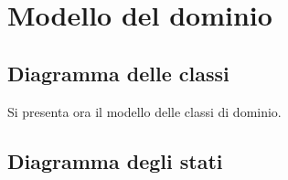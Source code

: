 
\chapter{Modello del dominio}
\label{cap:modello-del-dominio}

\section{Diagramma delle classi}
Si presenta ora il modello delle classi di dominio.

\section{Diagramma degli stati}